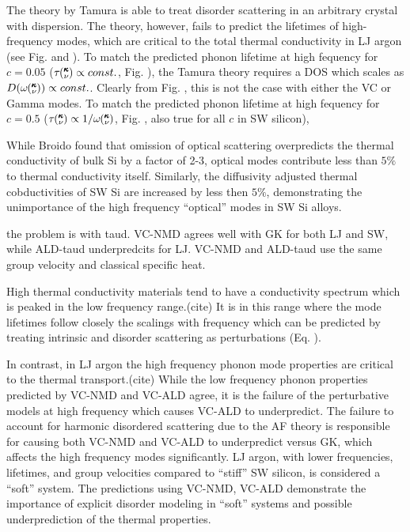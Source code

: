 \documentclass[aps,prb,onecolumn,preprint,superscriptaddress,amsmath,amssymb,floatfix]{revtex4}
\newcommand{\kv}{\mspace{-4.0mu}\left(\mspace{-8.0mu}
\begin{smallmatrix}&\pmb{\kappa} \\&\nu\end{smallmatrix}
\mspace{-3.0mu}\right)}
\begin{document}
The theory by Tamura is able to treat disorder scattering in an arbitrary 
crystal with dispersion. The theory, however, fails to predict the 
lifetimes of high-frequency modes, which are critical to the total 
thermal conductivity in LJ argon (see Fig. and ). To match the predicted 
phonon lifetime at high fequency for $c=0.05$ 
($\tau\kv \propto const.$, Fig. ), 
the Tamura theory requires a DOS which scales as 
$D(\omega\kv) \propto const.$. Clearly from Fig. , this is not the case 
with either the VC or Gamma modes. To match the predicted 
phonon lifetime at high fequency for $c=0.5$ 
($\tau\kv \propto 1/\omega\kv$, Fig. , also true for all $c$ in SW silicon), 

While Broido found that omission of optical scattering overpredicts 
the thermal 
conductivity of bulk Si by a factor of 2-3, 
optical modes contribute less than $5\%$ 
to thermal conductivity itself. Similarly, the diffusivity adjusted thermal 
cobductivities of SW Si are increased by less then $5\%$, demonstrating the 
unimportance of the high frequency ``optical'' modes in SW Si alloys.

the problem is with taud.  VC-NMD agrees well with GK for both LJ and SW, 
while ALD-taud underpredcits for LJ.  VC-NMD and ALD-taud use the same 
group velocity and classical specific heat.



High thermal conductivity materials tend to have a conductivity spectrum 
which is peaked in the low frequency range.(cite) 
It is in this range where the mode 
lifetimes follow closely the scalings with frequency which can be 
predicted by treating intrinsic and disorder scattering as 
perturbations (Eq. ).

In contrast, 
in LJ argon the high frequency phonon mode properties are critical 
to the thermal transport.(cite)  
While the low frequency phonon properties predicted by VC-NMD and 
VC-ALD agree, it is the failure of the perturbative models at 
high frequency which causes VC-ALD to underpredict. The failure 
to account for harmonic disordered scattering due to the AF theory 
is responsible for causing both VC-NMD and VC-ALD to underpredict 
versus GK, which affects the high frequency modes significantly. 
LJ argon, with lower 
frequencies, lifetimes, and group velocities compared to 
``stiff'' SW silicon, 
is considered a ``soft'' system. The predictions using 
VC-NMD, VC-ALD demonstrate the importance of explicit disorder 
modeling in ``soft'' systems and possible underprediction 
of the thermal properties.\cite{tian_phonon_2012}
\end{document}
